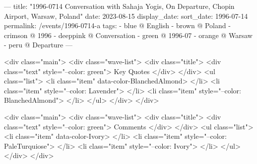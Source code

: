 ---
title: "1996-0714 Conversation with Sahaja Yogis, On Departure, Chopin Airport, Warsaw, Poland"
date: 2023-08-15
display_date: 
sort_date: 1996-07-14
permalink: /events/1996-0714-a
tags:
  - blue @ English
  - brown @ Poland
  - crimson @ 1996
  - deeppink @ Conversation
  - green @ 1996-07
  - orange @ Warsaw
  - peru @ Departure
---

<div class="main">
  <div class="wave-list">
    <div class="title">
      <div class="text" style="--color: green">
        Key Quotes
      </div>
    </div>
    <ul class="list">
        <li class="item" data-color-BlanchedAlmond>
        </li>
        <li class="item" style="--color: Lavender">
        </li>
        <li class="item" style="--color: BlanchedAlmond">
        </li>
      </ul>
  </div>
</div>

<div class="main">
  <div class="wave-list">
    <div class="title">
      <div class="text" style="--color: green">
        Comments
      </div>
    </div>
    <ul class="list">
        <li class="item" data-color-Ivory>
        </li>
        <li class="item" style="--color: PaleTurquiose">
        </li>
        <li class="item" style="--color: Ivory">
        </li>
      </ul>
  </div>
</div>